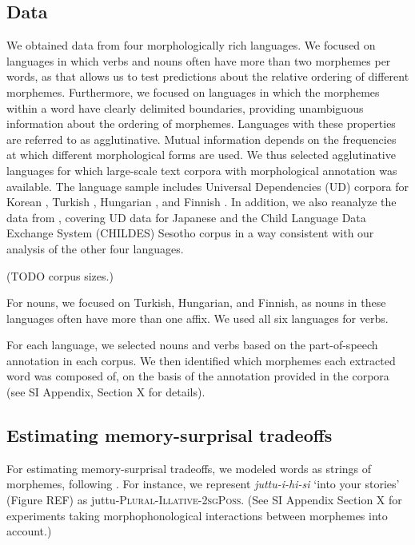 \documentclass[11pt,letterpaper]{article}
\newcommand{\citep}{\parencite}
\newcommand{\citet}{\Textcite}
\newcommand\mhahn[1]{{\color{red}(#1)}}
\newcommand{\jd}[1]{\textcolor{Pink}{[jd: #1]}}
\begin{document}
\subsection{Data} %


We obtained data from four morphologically rich languages.
We focused on languages in which verbs and nouns often have more than two morphemes per words, as that allows us to test predictions about the relative ordering of different morphemes.
Furthermore, we focused on languages in which the morphemes within a word have clearly delimited boundaries, providing unambiguous information about the ordering of morphemes.
Languages with these properties are referred to as agglutinative.
Mutual information depends on the frequencies at which different morphological forms are used. We thus selected agglutinative languages for which large-scale text corpora with morphological annotation was available.
The language sample includes Universal Dependencies (UD) corpora for Korean \citep{chun2018building}, Turkish \citep{turkish-imst}, Hungarian \citep{hungarian-szeged}, and Finnish \citep{UDFinnish-TDT}.
In addition, we also reanalyze the data from \citet{Hahn2020modeling}, covering UD data for Japanese \citep{asahara2018universal} and the Child Language Data Exchange System (CHILDES) Sesotho corpus \citep{demuth1992acquisition} in a way consistent with our analysis of the other four languages.


\mhahn{TODO corpus sizes.}


For nouns, we focused on Turkish, Hungarian, and Finnish, as nouns in these languages often have more than one affix.
We used all six languages for verbs.

For each language, we selected nouns and verbs based on the part-of-speech annotation in each corpus.
We then identified which morphemes each extracted word was composed of, on the basis of the annotation provided in the corpora (see SI Appendix, Section X for details).



\subsection{Estimating memory-surprisal tradeoffs}

For estimating memory-surprisal tradeoffs, we modeled words as strings of morphemes, following \citet{Hahn2020modeling}.
For instance, we represent \textit{juttu-i-hi-si} `into your stories' (Figure REF) as juttu-\textsc{Plural}-\textsc{Illative}-\textsc{2sgPoss}.
(See SI Appendix Section X for experiments taking morphophonological interactions between morphemes into account.)
\end{document}
